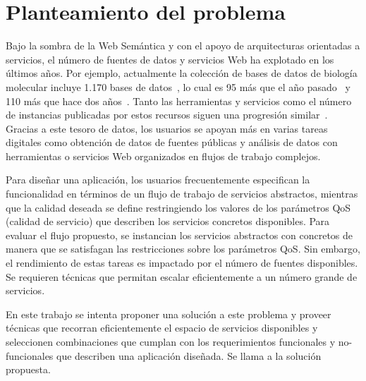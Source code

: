 \section{Planteamiento del problema}

Bajo la sombra de la Web Semántica y con el apoyo de arquitecturas orientadas a
servicios, el número de fuentes de datos y servicios Web ha explotado en los
últimos años. Por ejemplo, actualmente la colección de bases de datos de
biología molecular incluye 1.170 bases de datos~\cite{Galperin09}, lo cual es 95
más que el año pasado~\cite{Galperin2008} y 110 más que hace dos
años~\cite{Galperin2007}. Tanto las herramientas y servicios como el número de
instancias publicadas por estos recursos siguen una progresión
similar~\cite{Benson07}. Gracias a este tesoro de datos, los usuarios se apoyan
más en varias tareas digitales como obtención de datos de fuentes públicas y
análisis de datos con herramientas o servicios Web organizados en flujos de
trabajo complejos.

Para diseñar una aplicación, los usuarios frecuentemente especifican la
funcionalidad en términos de un flujo de trabajo de servicios abstractos,
mientras que la calidad deseada se define restringiendo los valores de los
parámetros QoS (calidad de servicio) que describen los servicios concretos
disponibles. Para evaluar el flujo propuesto, se instancian los servicios
abstractos con concretos de manera que se satisfagan las restricciones sobre los
parámetros QoS. Sin embargo, el rendimiento de estas tareas es impactado por el
número de fuentes disponibles. Se requieren técnicas que permitan escalar
eficientemente a un número grande de servicios.

En este trabajo se intenta proponer una solución a este problema y proveer
técnicas que recorran eficientemente el espacio de servicios disponibles y
seleccionen combinaciones que cumplan con los requerimientos funcionales y
no-funcionales que describen una aplicación diseñada. Se llama 
\mcdsatc a la solución propuesta.

